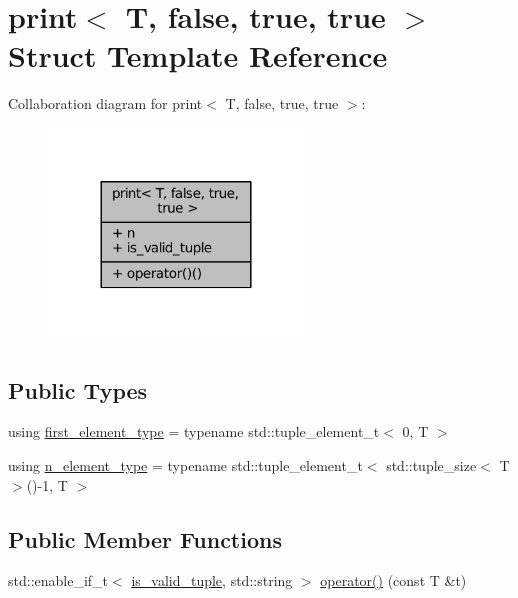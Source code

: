 \hypertarget{structprint_3_01T_00_01false_00_01true_00_01true_01_4}{}\section{print$<$ T, false, true, true $>$ Struct Template Reference}
\label{structprint_3_01T_00_01false_00_01true_00_01true_01_4}


Collaboration diagram for print$<$ T, false, true, true $>$\+:
\nopagebreak
\begin{figure}[H]
\begin{center}
\leavevmode
\includegraphics[width=192pt]{structprint_3_01T_00_01false_00_01true_00_01true_01_4__coll__graph}
\end{center}
\end{figure}
\subsection*{Public Types}
\begin{DoxyCompactItemize}
\item 
using \hyperlink{structprint_3_01T_00_01false_00_01true_00_01true_01_4_a2dae0d9d3db0a28ae73051bef2394aaa}{first\+\_\+element\+\_\+type} = typename std\+::tuple\+\_\+element\+\_\+t$<$ 0, T $>$
\item 
using \hyperlink{structprint_3_01T_00_01false_00_01true_00_01true_01_4_a6b6bfb81869a40026880ebd0d82cd25a}{n\+\_\+element\+\_\+type} = typename std\+::tuple\+\_\+element\+\_\+t$<$ std\+::tuple\+\_\+size$<$ T $>$()-\/1, T $>$
\end{DoxyCompactItemize}
\subsection*{Public Member Functions}
\begin{DoxyCompactItemize}
\item 
std\+::enable\+\_\+if\+\_\+t$<$ \hyperlink{structprint_3_01T_00_01false_00_01true_00_01true_01_4_ac26cb1e1f2d4e622fc9bd7ba97555dc4}{is\+\_\+valid\+\_\+tuple}, std\+::string $>$ \hyperlink{structprint_3_01T_00_01false_00_01true_00_01true_01_4_a6be8db822c3eb9a125d9f45eef7853a9}{operator()} (const T \&t)
\end{DoxyCompactItemize}
